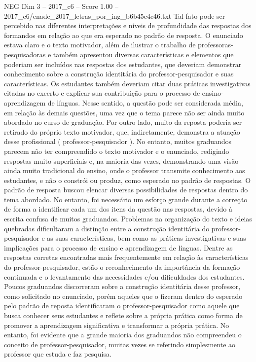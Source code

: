 \begin{textsample}{NEG Dim 3 – 2017\_c6 – Score 1.00 – 2017\_c6/enade\_2017\_letras\_por\_ing\_b6b45c4c46.txt}
Tal fato pode ser percebido nas diferentes interpretações e níveis de profundidade das respostas dos formandos em relação ao que era esperado no padrão de resposta.
O enunciado estava claro e o texto motivador, além de ilustrar o trabalho de professoras-pesquisadoras e também apresentou diversas características e elementos que poderiam ser incluídos nas respostas dos estudantes, que deveriam demonstrar conhecimento sobre a construção identitária do professor-pesquisador e suas características.
Os estudantes também deveriam citar duas práticas investigativas citadas no excerto e explicar sua contribuição para o processo de ensino-aprendizagem de línguas.
Nesse sentido, a questão pode ser considerada média, em relação às demais questões, uma vez que o tema parece não ser ainda muito abordado no curso de graduação.
Por outro lado, muito da reposta poderia ser retirado do próprio texto motivador, que, indiretamente, demonstra a atuação desse profissional ( professor-pesquisador ).
No entanto, muitos graduandos parecem não ter compreendido o texto motivador e o enunciado, redigindo respostas muito superficiais e, na maioria das vezes, demonstrando uma visão ainda muito tradicional do ensino, onde o professor transmite conhecimento aos estudantes, e não o constrói ou produz, como esperado no padrão de respostas.
O padrão de resposta buscou elencar diversas possibilidades de respostas dentro do tema abordado.
No entanto, foi necessário um esforço grande durante a correção de forma a identificar cada um dos itens da questão nas respostas, devido à escrita confusa de muitos graduandos.
Problemas na organização do texto e ideias quebradas dificultaram a distinção entre a construção identitária do professor-pesquisador e as suas características, bem como as práticas investigativas e suas implicações para o processo de ensino e aprendizagem de línguas.
Dentre as respostas corretas encontradas mais frequentemente em relação às características do professor-pesquisador, estão o reconhecimento da importância da formação continuada e o levantamento das necessidades e/ou dificuldades dos estudantes.
Poucos graduandos discorreram sobre a construção identitária desse professor, como solicitado no enunciado, porém aqueles que o fizeram dentro do esperado pelo padrão de reposta identificaram o professor-pesquisador como aquele que busca conhecer seus estudantes e reflete sobre a própria prática como forma de promover a aprendizagem significativa e transformar a própria prática.
No entanto, foi evidente que a grande maioria dos graduandos não compreendeu o conceito de professor-pesquisador, muitas vezes se referindo simplesmente ao professor que estuda e faz pesquisa.

\end{textsample}
